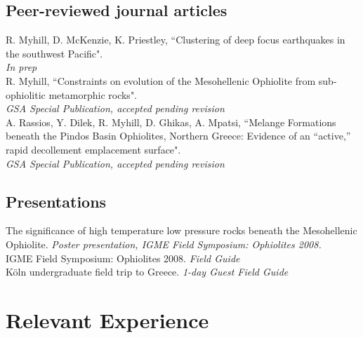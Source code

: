 \documentclass[10pt,a4paper]{article}
\newcommand{\years}[1]{\marginpar{\scriptsize #1 } }
\begin{document}
\subsection*{Peer-reviewed journal articles}
\noindent
\years{2009}R. Myhill, D. McKenzie, K. Priestley, ``Clustering of deep focus earthquakes in the southwest Pacific". \\\emph{In prep}\\
\years{2008}R. Myhill, ``Constraints on evolution of the Mesohellenic Ophiolite from sub-ophiolitic metamorphic rocks". \\\emph{GSA Special Publication, accepted pending revision}\\
\years{2008}A. Rassios, Y. Dilek, R. Myhill, D. Ghikas, A. Mpatsi, ``Melange Formations beneath the Pindos Basin Ophiolites, Northern Greece: Evidence of an “active,” rapid decollement emplacement surface". \\\emph{GSA Special Publication, accepted pending revision}

\subsection*{Presentations}
\noindent
\years{2008}The significance of high temperature low pressure rocks beneath the Mesohellenic Ophiolite. \emph{Poster presentation, IGME Field Symposium: Ophiolites 2008.}\\
IGME Field Symposium: Ophiolites 2008. \emph{Field Guide}\\
K\"{o}ln undergraduate field trip to Greece. \emph{1-day Guest Field Guide}

\section*{Relevant Experience}
\end{document}
